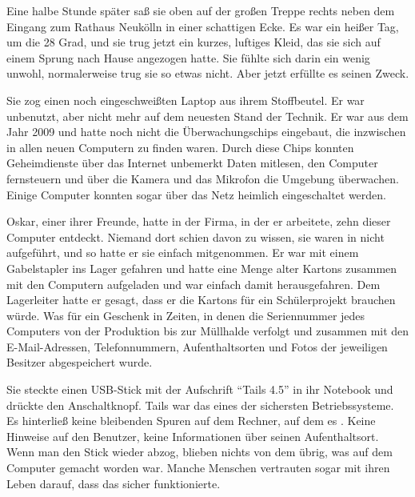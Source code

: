 Eine halbe Stunde später saß sie oben auf der großen Treppe rechts neben dem Eingang zum Rathaus Neukölln in einer schattigen Ecke.
Es war ein heißer Tag, um die 28 Grad, und sie trug jetzt ein kurzes, luftiges Kleid, das sie sich auf einem Sprung nach Hause angezogen hatte.
Sie fühlte sich darin ein wenig unwohl, normalerweise trug sie so etwas nicht.
Aber jetzt erfüllte es seinen Zweck.

Sie zog einen noch eingeschweißten Laptop aus ihrem Stoffbeutel.
Er war unbenutzt, aber nicht mehr auf dem neuesten Stand der Technik.
Er war aus dem Jahr 2009 und hatte noch nicht die Überwachungschips eingebaut, die inzwischen in allen neuen Computern zu finden waren.
Durch diese Chips konnten Geheimdienste über das Internet unbemerkt Daten mitlesen, den Computer fernsteuern und über die Kamera und das Mikrofon die Umgebung überwachen. Einige Computer konnten sogar über das Netz heimlich eingeschaltet werden.


Oskar, einer ihrer Freunde, hatte in der Firma, in der er arbeitete, zehn dieser Computer entdeckt.
Niemand dort schien davon zu wissen, sie waren in  nicht aufgeführt, und so hatte er sie einfach mitgenommen.
Er war mit einem Gabelstapler ins Lager gefahren und hatte eine Menge alter Kartons zusammen mit den Computern aufgeladen und war einfach damit herausgefahren.
Dem Lagerleiter hatte er gesagt, dass er die Kartons für ein Schülerprojekt brauchen würde.
Was für ein Geschenk in Zeiten, in denen die Seriennummer jedes Computers von der Produktion bis zur Müllhalde verfolgt und zusammen mit den E-Mail-Adressen, Telefonnummern, Aufenthaltsorten und Fotos der jeweiligen Besitzer abgespeichert wurde.

Sie steckte einen USB-Stick mit der Aufschrift \enquote{Tails 4.5} in ihr Notebook und drückte den Anschaltknopf.
Tails war das eines der sichersten Betriebssysteme.
Es hinterließ keine bleibenden Spuren auf dem Rechner, auf dem es .
Keine Hinweise auf den Benutzer, keine Informationen über seinen Aufenthaltsort.
Wenn man den Stick wieder abzog, blieben nichts von dem übrig, was auf dem Computer gemacht worden war.
Manche Menschen vertrauten sogar mit ihren Leben darauf, dass das sicher funktionierte.

